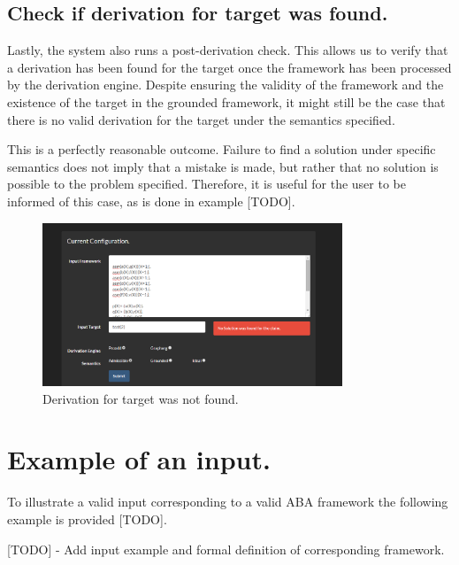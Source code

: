 \subsection{Check if derivation for target was found.}

Lastly, the system also runs a post-derivation check. This allows us to verify that a derivation has been found for the target once the framework has been processed by the derivation engine. Despite ensuring the validity of the framework and the existence of the target in the grounded framework, it might still be the case that there is no valid derivation for the target under the semantics specified.

This is a perfectly reasonable outcome. Failure to find a solution under specific semantics does not imply that a mistake is made, but rather that no solution is possible to the problem specified. Therefore, it is useful for the user to be informed of this case, as is done in example [TODO].

\clearpage

\begin{figure}[h]
    \centering
    \includegraphics[width=0.8\textwidth]{inputSolNotFound.png}
    \caption{Derivation for target was not found.}
    \label{fig:sol_not_found}
\end{figure}

\section{Example of an input.}

To illustrate a valid input corresponding to a valid ABA framework the following example is provided [TODO].

[TODO] - Add input example and formal definition of corresponding framework.